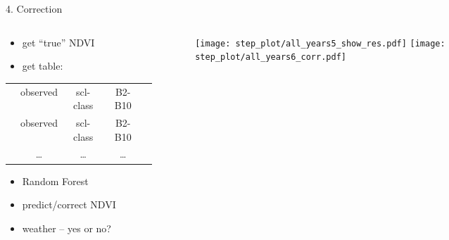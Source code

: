 \begin{frame}[t]{4. Correction}
    \begin{columns}
        \begin{column}{0.45\textwidth}
            \begin{itemize}
                \item get ``true'' NDVI
                \item get table:
            \end{itemize}

            \scriptsize
            \begin{tabular}{| c |  c c c c |}
                \hline
                \color{myred}{``truth''} & observed & scl-class & B2-B10 & \color{mygray}{weather} \\
                \color{myred}{``truth''} & observed & scl-class & B2-B10 & \color{mygray}{weather} \\
                \color{myred}{\dots    } & \dots    & \dots     & \dots  & \color{mygray}{\dots}   \\
            \end{tabular}\normalsize \vspace{0.5cm}
            \begin{itemize}
                \item Random Forest
                \item predict/correct NDVI
                \item weather -- yes or no?
            \end{itemize}
        \end{column}
        \begin{column}{0.45\textwidth}
            \begin{figure}
                \vspace{-1.6cm}
                \texttt{[image: step\_plot/all\_years5\_show\_res.pdf]}
                \texttt{[image: step\_plot/all\_years6\_corr.pdf]}
            \end{figure}
        \end{column}
    \end{columns}
\end{frame}

